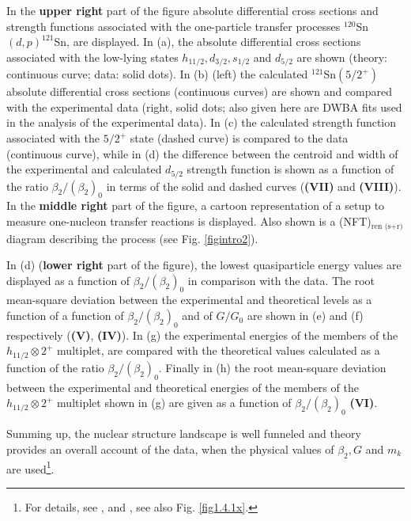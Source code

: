    In the  \textbf{upper right} part of the figure absolute differential cross sections and strength functions associated with the one-particle transfer processes $^{120}$Sn$(d,p)^{121}$Sn, are displayed. In  (a), the absolute differential cross sections associated with the low-lying  states $h_{11/2},d_{3/2},s_{1/2}$ and $d_{5/2}$ are shown (theory: continuous curve; data: solid dots). In (b) (left) the calculated $^{121}$Sn$(5/2^+)$ absolute differential cross sections (continuous curves) are shown and compared with the experimental data (right, solid dots; also given here are DWBA fits used in the analysis of the experimental data). In (c)  the calculated strength function associated with the $5/2^+$ state (dashed curve) is compared to the data (continuous curve), while in  (d) the difference between the centroid and  width of the experimental and calculated $d_{5/2}$ strength function  is shown as a function of the ratio $\beta_2/(\beta_2)_0$ in terms of the solid and dashed curves (\textbf{(VII)} and \textbf{(VIII)}).
    In the \textbf{middle right} part of the figure, a cartoon representation of a setup to measure one-nucleon transfer reactions is displayed. Also shown is a (NFT)$_{\text{ren (s+r)}}$ diagram  describing the process (see Fig. \ref{figintro2}).
    
    
      In (d)  (\textbf{lower right} part of the figure), the lowest quasiparticle energy values are displayed as a function of $\beta_2/(\beta_2)_0$ in comparison with the data.  The root mean-square deviation between the experimental and theoretical levels as a function of a function of  $\beta_2/(\beta_2)_0$ and  of $G/G_0$ are shown in (e) and (f) respectively (\textbf{(V)}, \textbf{(IV)}). In (g) the  experimental energies of the members of the $h_{11/2}\otimes 2^+$  multiplet, are compared with the theoretical values calculated as a function of the ratio $\beta_2/(\beta_2)_0$. Finally in (h) the root mean-square deviation between the experimental and theoretical energies of the members of the $h_{11/2}\otimes 2^+$ multiplet shown in (g) are given as a function of $\beta_2/(\beta_2)_0$ \textbf{(VI)}. 
  
  
  Summing up, the nuclear structure landscape is well funneled and  theory provides an overall account of the data, when the physical values of $\beta_2,G$ and $m_k$ are used\footnote{For details, see \cite{Idini:15}, and \cite{Broglia:16}, see also  Fig. \ref{fig1.4.1x}.}.

